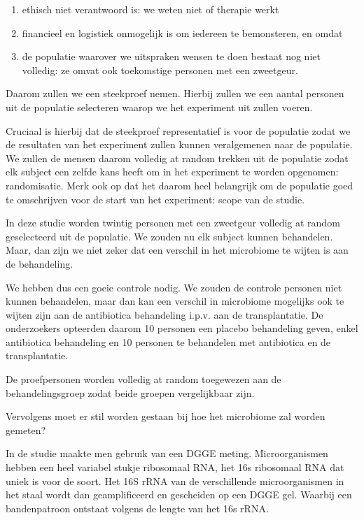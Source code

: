 \documentclass[
  12pt,dutch,coursenotes]{book}
\providecommand{\tightlist}{%
  \setlength{\itemsep}{0pt}\setlength{\parskip}{0pt}}
\begin{document}
\begin{enumerate}
\def\labelenumi{\arabic{enumi}.}
\tightlist
\item
  ethisch niet verantwoord is: we weten niet of therapie werkt
\item
  financieel en logistiek onmogelijk is om iedereen te bemonsteren, en omdat
\item
  de populatie waarover we uitspraken wensen te doen bestaat nog niet volledig: ze omvat ook toekomstige personen met een zweetgeur.
\end{enumerate}

Daarom zullen we een steekproef nemen.
Hierbij zullen we een aantal personen uit de populatie selecteren waarop we het experiment uit zullen voeren.

Cruciaal is hierbij dat de steekproef representatief is voor de populatie zodat we de resultaten van het experiment zullen kunnen veralgemenen naar de populatie. We zullen de mensen daarom volledig at random trekken uit de populatie zodat elk subject een zelfde kans heeft om in het experiment te worden opgenomen: randomisatie.
Merk ook op dat het daarom heel belangrijk om de populatie goed te omschrijven voor de start van het experiment: scope van de studie.

In deze studie worden twintig personen met een zweetgeur volledig at random geselecteerd uit de populatie.
We zouden nu elk subject kunnen behandelen.
Maar, dan zijn we niet zeker dat een verschil in het microbiome te wijten is aan de behandeling.

We hebben dus een goeie controle nodig.
We zouden de controle personen niet kunnen behandelen, maar dan kan een verschil in microbiome mogelijks ook te wijten zijn aan de antibiotica behandeling i.p.v. aan de transplantatie.
De onderzoekers opteerden daarom 10 personen een placebo behandeling geven, enkel antibiotica behandeling en 10 personen te behandelen met antibiotica en de transplantatie.

De proefpersonen worden volledig at random toegewezen aan de behandelingsgroep zodat beide groepen vergelijkbaar zijn.

Vervolgens moet er stil worden gestaan bij hoe het microbiome zal worden gemeten?

In de studie maakte men gebruik van een DGGE meting.
Microorganismen hebben een heel variabel stukje ribosomaal RNA, het 16s ribosomaal RNA dat uniek is voor de soort.
Het 16S rRNA van de verschillende microorganismen in het staal wordt dan geamplificeerd en gescheiden op een DGGE gel.
Waarbij een bandenpatroon ontstaat volgens de lengte van het 16s rRNA.
\end{document}
